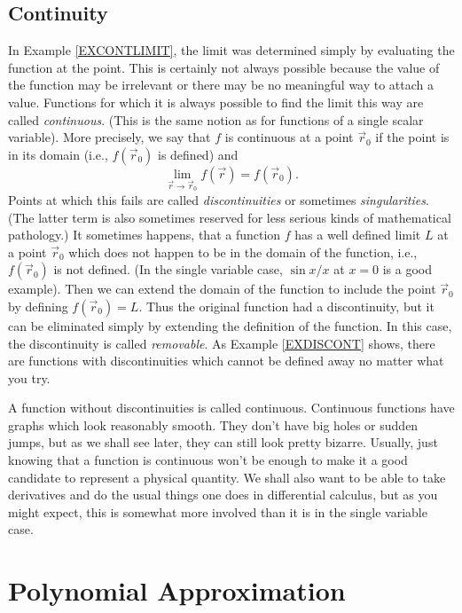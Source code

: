 \subsection{Continuity}
In Example \ref{EXCONTLIMIT}, the limit was determined simply by evaluating the
function at the point.  This is certainly not always possible
because the value of the function may be irrelevant or there
may be no 
meaningful 
way to 
attach a value.   Functions
for which it is always possible to find the limit this way
 are called
\emph{continuous}.  (This is the same notion as for functions
of a single scalar variable).  More precisely, we say that
$f$ is continuous at a point $\vec r_0$ if the point is in its domain (i.e.,
$f(\vec r_0)$ is defined) and
\[
  \lim_{\vec r \to \vec r_0} f(\vec r) = f(\vec r_0).
\]
Points at which this fails  are called \emph{discontinuities}
or sometimes \emph{singularities}.   (The latter term is also sometimes
reserved for less serious kinds of mathematical pathology.)  It
sometimes happens, that a function $f$ has a well defined limit $L$ at
a point $\vec r_0$ which does not happen to be in the domain of the function,
i.e., $f(\vec r_0)$ is not defined.  (In the single variable case,
$\sin x/ x$ at $x = 0$ is a good example).  Then we can extend the
domain of the function to include the point $\vec r_0$ by defining
$f(\vec r_0) = L$.   Thus the original function had a discontinuity,
but it can be eliminated simply by extending the definition of the
function.  In this case, the discontinuity is called
\emph{removable}.   As Example \ref{EXDISCONT} shows, there are functions
with  discontinuities
which cannot be defined away no matter what you try.  
 
  A function without discontinuities is called continuous.
Continuous functions have graphs which look reasonably 
smooth.  They don't have big holes or sudden jumps,
 but as we shall see later, they can still look pretty
bizarre.   Usually, just knowing that a function is continuous
won't be enough to make it a good candidate to represent a
physical quantity.  We shall also want to be able to take
derivatives and do the usual things one does in differential
calculus, but as you might expect, this is somewhat more involved
than it is in the single variable case. 


\begin{exercises}
\end{exercises}

\section{Polynomial Approximation}

